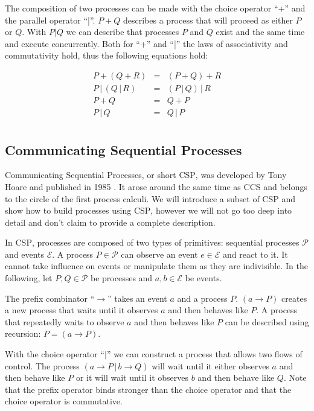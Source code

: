 The composition of two processes can be made with the choice operator \enquote{+} and the parallel operator \enquote{|}. $P + Q$ describes a process that will proceed as either $P$ or $Q$. With $P | Q$ we can describe that processes $P$ and $Q$ exist and the same time and execute concurrently. Both for \enquote{+} and \enquote{|} the laws of associativity and commutativity hold, thus the following equations hold:

\begin{eqnarray*}
  P + \left( Q + R \right) & = & \left( P + Q \right) + R \\
  P \,|\, \left( Q \,|\, R \right) & = & \left( P \,|\, Q \right) \,|\, R \\
  P + Q & = & Q + P \\
  P \,|\, Q & = & Q \,|\, P \\
\end{eqnarray*}

\subsection{Communicating Sequential Processes}
Communicating Sequential Processes, or short \textsc{CSP}, was developed by Tony Hoare and published in 1985 \cite{Hoare:1985:CSP:3921}. It arose around the same time as \textsc{CCS} and belongs to the circle of the first process calculi. We will introduce a subset of \textsc{CSP} and show how to build processes using \textsc{CSP}, however we will not go too deep into detail and don't claim to provide a complete description.

In \textsc{CSP}, processes are composed of two types of primitives: sequential processes $\mathcal{P}$ and events $\mathcal{E}$. A process $P \in \mathcal{P}$ can observe an event $e \in \mathcal{E}$ and react to it. It cannot take influence on events or manipulate them as they are indivisible. In the following, let $P, Q \in \mathcal{P}$ be processes and $a,b \in \mathcal{E}$ be events.

The prefix combinator \enquote{$\to$} takes an event $a$ and a process $P$. $\left( a \to P \right)$ creates a new process that waits until it observes $a$ and then behaves like $P$. A process that repeatedly waits to observe $a$ and then behaves like $P$ can be described using recursion: $P = \left( a \to P \right)$.

With the choice operator \enquote{$|$} we can construct a process that allows two flows of control. The process $\left( a \to P \,|\, b \to Q \right)$ will wait until it either observes $a$ and then behave like $P$ or it will wait until it observes $b$ and then behave like $Q$. Note that the prefix operator binds stronger than the choice operator and that the choice operator is commutative.

